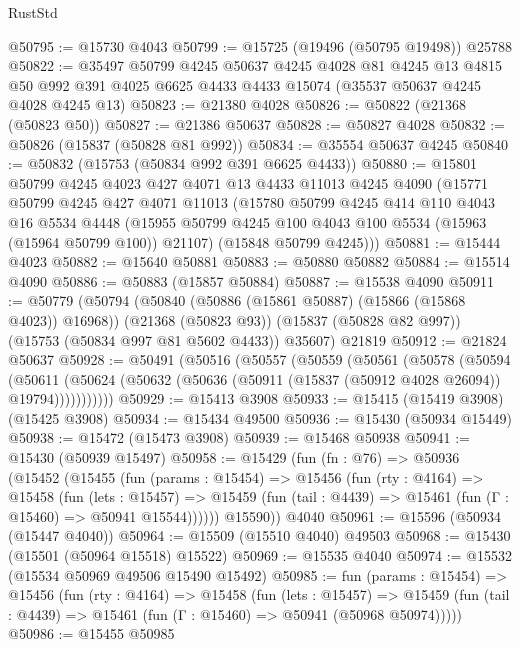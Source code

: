 \begin{lexlean}{RustStd}
\begin{coremodule}
{\begin{coremodule}
{{{{{{{{{{{{{{{{{{{{{{{{{{{{{{{{{{{{{{{{{{{{{{{{{{{{{{{{{{{{@50795 := @15730 @4043
@50799 := @15725 (@19496 (@50795 @19498)) @25788
@50822 := @35497
    @50799
    @4245
    @50637
    @4245
    @4028
    @81
    @4245
    @13
    @4815
    @50
    @992
    @391
    @4025
    @6625
    @4433
    @4433
    @15074
    (@35537 @50637 @4245 @4028 @4245 @13)
@50823 := @21380 @4028
@50826 := @50822 (@21368 (@50823 @50))
@50827 := @21386 @50637
@50828 := @50827 @4028
@50832 := @50826 (@15837 (@50828 @81 @992))
@50834 := @35554 @50637 @4245
@50840 := @50832 (@15753 (@50834 @992 @391 @6625 @4433))
@50880 := @15801
    @50799
    @4245
    @4023
    @427
    @4071
    @13
    @4433
    @11013
    @4245
    @4090
    (@15771
      @50799
      @4245
      @427
      @4071
      @11013
      (@15780
        @50799
        @4245
        @414
        @110
        @4043
        @16
        @5534
        @4448
        (@15955 @50799 @4245 @100 @4043 @100 @5534 (@15963 (@15964 @50799 @100)) @21107)
        (@15848 @50799 @4245)))
@50881 := @15444 @4023
@50882 := @15640 @50881
@50883 := @50880 @50882
@50884 := @15514 @4090
@50886 := @50883 (@15857 @50884)
@50887 := @15538 @4090
@50911 := @50779
    (@50794
      (@50840 (@50886 (@15861 @50887) (@15866 (@15868 @4023)) @16968))
      (@21368 (@50823 @93))
      (@15837 (@50828 @82 @997))
      (@15753 (@50834 @997 @81 @5602 @4433))
      @35607)
    @21819
@50912 := @21824 @50637
@50928 := @50491
    (@50516
      (@50557
        (@50559
          (@50561
            (@50578
              (@50594
                (@50611
                  (@50624 (@50632 (@50636 (@50911 (@15837 (@50912 @4028 @26094)) @19794)))))))))))
@50929 := @15413 @3908
@50933 := @15415 (@15419 @3908) (@15425 @3908)
@50934 := @15434 @49500
@50936 := @15430 (@50934 @15449)
@50938 := @15472 (@15473 @3908)
@50939 := @15468 @50938
@50941 := @15430 (@50939 @15497)
@50958 := @15429
    (fun (fn : @76) =>
    @50936
      (@15452
        (@15455
          (fun (params : @15454) =>
          @15456
            (fun (rty : @4164) =>
            @15458
              (fun (lets : @15457) =>
              @15459 (fun (tail : @4439) => @15461 (fun (Γ : @15460) => @50941 @15544))))))
        @15590))
    @4040
@50961 := @15596 (@50934 (@15447 @4040))
@50964 := @15509 (@15510 @4040) @49503
@50968 := @15430 (@15501 (@50964 @15518) @15522)
@50969 := @15535 @4040
@50974 := @15532 (@15534 @50969 @49506 @15490 @15492)
@50985 := fun (params : @15454) =>
  @15456
    (fun (rty : @4164) =>
    @15458
      (fun (lets : @15457) =>
      @15459 (fun (tail : @4439) => @15461 (fun (Γ : @15460) => @50941 (@50968 @50974)))))
@50986 := @15455 @50985
}}}}}}}}}}}}}}}}}}}}}}}}}}}}}}}}}}}}}}}}}}}}}}}}}}}}}}}}}}}}
\end{coremodule}}
\end{coremodule}
\end{lexlean}
